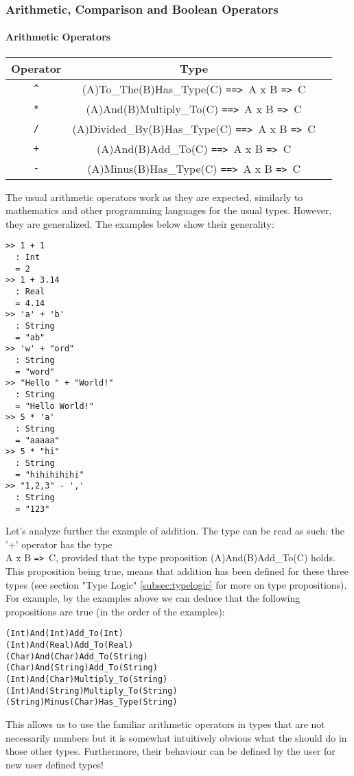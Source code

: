 \documentclass{article}
\def\ra{\texttt{=>}\ }
\def\Ra{\texttt{==>}\ }
\begin{document}
\subsubsection{Arithmetic, Comparison and Boolean Operators}

\paragraph{Arithmetic Operators}
\begin{center}
\begin{tabular}{ |c|c|c| } 
\hline
Operator & Type \\ 
\hline
\hline
\texttt{\^} & (A)To_The(B)Has_Type(C) \Ra A x B \ra C \\
\hline
\texttt{*} & (A)And(B)Multiply_To(C) \Ra A x B \ra C \\
\hline
\texttt{/} & (A)Divided_By(B)Has_Type(C) \Ra A x B \ra C \\
\hline
\texttt{+} & (A)And(B)Add_To(C) \Ra A x B \ra C \\ 
\hline
\texttt{-} & (A)Minus(B)Has_Type(C) \Ra A x B \ra C \\
\hline
\end{tabular}
\end{center}
The usual arithmetic operators work as they are expected, similarly to
mathematics and other programming languages for the usual types. However, they
are generalized. The examples below show their generality:
\begin{verbatim}
>> 1 + 1
  : Int
  = 2
>> 1 + 3.14
  : Real
  = 4.14
>> 'a' + 'b'
  : String
  = "ab"
>> 'w' + "ord"
  : String
  = "word"
>> "Hello " + "World!"
  : String
  = "Hello World!"
>> 5 * 'a'
  : String
  = "aaaaa"
>> 5 * "hi"
  : String
  = "hihihihihi"
>> "1,2,3" - ','
  : String
  = "123"
\end{verbatim}
Let's analyze further the example of addition. The type can be read as such:
the '+' operator has the type \\ A x B \ra C, provided that the type
proposition (A)And(B)Add_To(C) holds. This proposition being true, means that
addition has been defined for these three types (see section "Type Logic"
\ref{subsec:typelogic} for more on type propositions). For example, by the examples
above we can deduce that the following propositions are true (in the order of the 
examples):
\begin{verbatim}
(Int)And(Int)Add_To(Int)
(Int)And(Real)Add_To(Real)
(Char)And(Char)Add_To(String)
(Char)And(String)Add_To(String)
(Int)And(Char)Multiply_To(String)
(Int)And(String)Multiply_To(String)
(String)Minus(Char)Has_Type(String)
\end{verbatim}
This allows us to use the familiar arithmetic operators in types that are not
necessarily numbers but it is somewhat intuitively obvious what the should do
in those other types. Furthermore, their behaviour can be defined by the user
for new user defined types!
\end{document}
